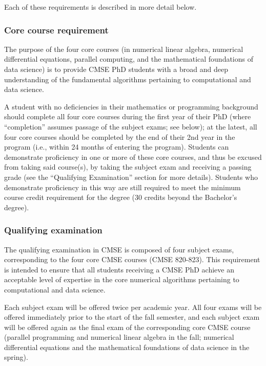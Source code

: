 Each of these requirements is described in more detail below.

\vspace{3mm}
\subsubsection{Core course requirement}

The purpose of the four core courses (in numerical linear algebra,
numerical differential equations, parallel computing, and the
mathematical foundations of data science) is to provide CMSE PhD
students with a broad and deep understanding of the fundamental
algorithms pertaining to computational and data science.

A student with no deficiencies in their mathematics or programming
background should complete all four core courses during the first year
of their PhD (where ``completion'' assumes passage of the subject exams;
see below); at the latest, all four core courses should be completed
by the end of their 2nd year in the program (i.e., within 24 months of
entering the program).  Students can demonstrate proficiency in
one or more of these core courses, and thus be excused from taking
said course(s), by taking the subject exam and receiving a passing
grade (see the ``Qualifying Examination'' section for more details).
Students who demonstrate proficiency in this way are still required to
meet the minimum course credit requirement for the degree (30 credits
beyond the Bachelor's degree).

\vspace{3mm}
\subsubsection{Qualifying examination}
\label{sec:qual_exam}

The qualifying examination in CMSE is composed of four subject exams,
corresponding to the four core CMSE courses (CMSE 820-823). This
requirement is intended to ensure that all students receiving a CMSE
PhD achieve an acceptable level of expertise in the core numerical
algorithms pertaining to computational and data science.  

Each subject exam will be offered twice per academic year.  All four
exams will be offered immediately prior to the start of the fall
semester, and each subject exam will be offered again as the final
exam of the corresponding core CMSE course (parallel programming and
numerical linear algebra in the fall; numerical differential equations
and the mathematical foundations of data science in the spring).

